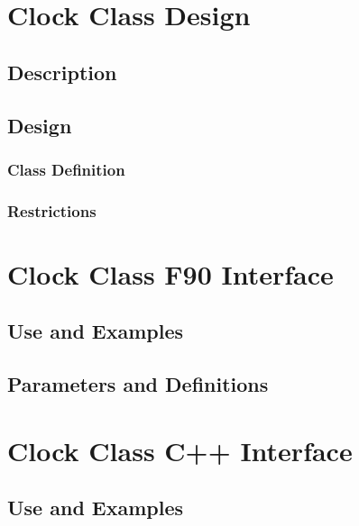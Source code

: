 \documentclass[]{article}
\begin{document}

\section{Clock Class Design}

\subsection{Description}


\subsection{Design}


\subsubsection{Class Definition}


\subsubsection{Restrictions}


\section{Clock Class F90 Interface}

\subsection{Use and Examples}


\subsection{Parameters and Definitions}




\section{Clock Class C++ Interface}

\subsection{Use and Examples}
%
\end{document}
